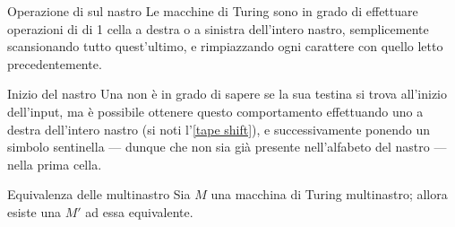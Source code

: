 \documentclass[a4paper, 12pt]{report}
\begin{document}
    \begin{framedobs}[label={tape shift}]{Operazione di  sul nastro}
        Le macchine di Turing sono in grado di effettuare operazioni di  di 1 cella a destra o a sinistra dell'intero nastro, semplicemente scansionando tutto quest'ultimo, e rimpiazzando ogni carattere con quello letto precedentemente.
    \end{framedobs}

    \begin{framedobs}[label={tape start}]{Inizio del nastro}
        Una \TM non è in grado di sapere se la sua testina si trova all'inizio dell'input, ma è possibile ottenere questo comportamento effettuando uno  a destra dell'intero nastro (si noti l'\cref{tape shift}), e successivamente ponendo un simbolo sentinella --- dunque che non sia già presente nell'alfabeto del nastro --- nella prima cella.
    \end{framedobs}

    \begin{framedprop}[label={multitape equiv}]{Equivalenza delle \TM multinastro}
        Sia $M$ una macchina di Turing multinastro; allora esiste una \TM $M'$ ad essa equivalente.
    \end{framedprop}
\end{document}
